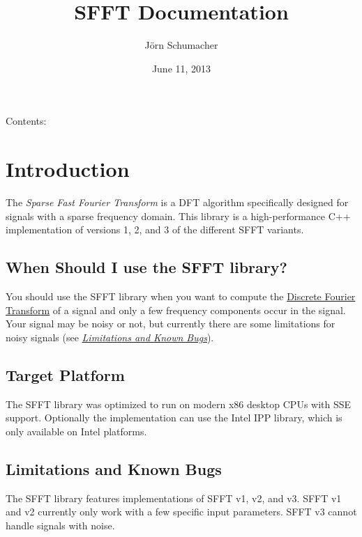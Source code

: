 \documentclass[letterpaper,10pt,english]{sphinxmanual}
\title{SFFT Documentation}
\date{June 11, 2013}
\author{Jörn Schumacher}
\begin{document}
\maketitle
\tableofcontents
{}\label{index::doc}


Contents:


\chapter{Introduction}
\label{introduction:introduction}\label{introduction::doc}\label{introduction:welcome-to-the-sfft-library-s-documentation}
The \emph{Sparse Fast Fourier Transform} is a DFT algorithm specifically designed
for signals with a sparse frequency domain. This library is a high-performance
C++ implementation of versions 1, 2, and 3 of the different SFFT variants.


\section{When Should I use the SFFT library?}
\label{introduction:when-should-i-use-the-sfft-library}
You should use the SFFT library when you want to compute the \href{http://en.wikipedia.org/wiki/Discrete\_Fourier\_transform}{Discrete Fourier
Transform} of a signal and only a few frequency components
occur in the signal. Your signal may be noisy or not, but currently there are
some limitations for noisy signals (see {\hyperref[introduction:current-state]{\emph{Limitations and Known Bugs}}}).


\section{Target Platform}
\label{introduction:target-platform}\label{introduction:discrete-fourier-transform}
The SFFT library was optimized to run on modern x86 desktop CPUs with SSE
support. Optionally the implementation can use the Intel IPP library, which is
only available on Intel platforms.


\section{Limitations and Known Bugs}
\label{introduction:current-state}\label{introduction:limitations-and-known-bugs}
The SFFT library features implementations of SFFT v1, v2, and v3. SFFT v1 and
v2 currently only work with a few specific input parameters. SFFT v3 cannot
handle signals with noise.
\end{document}

